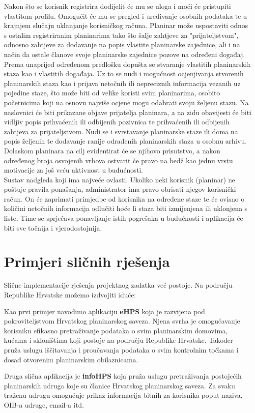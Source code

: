 		Nakon što se korisnik registrira dodijelit će mu se uloga  i moći će pristupiti vlastitom profilu. Omogućit će mu se pregled i uređivanje osobnih podataka te u krajnjem slučaju uklanjanje korisničkog računa. Planinar može uspostaviti odnos s ostalim registriranim planinarima tako što šalje zahtjeve za "prijateljstvom", odnosno zahtjeve za dodavanje na popis vlastite planinarske zajednice, ali i na način da ostale članove svoje planinarske zajednice pozove na određeni događaj. Prema unaprijed određenom predlošku dopušta se stvaranje vlastitih planinarskih staza kao i vlastitih događaja. Uz to se nudi i mogućnost ocjenjivanja stvorenih planinarskih staza kao i prijava netočnih ili nepreciznih informacija vezanih uz pojedine staze, što može biti od velike koristi svim planinarima, osobito početnicima koji na osnovu najviše ocjene mogu odabrati svoju željenu stazu. Na naslovnici će biti prikazane objave prijatelja planinara, a na zidu obavijesti će biti vidljiv popis prihvaćenih ili odbijenih pozivnica te prihvaćenih ili odbijenih zahtjeva za prijateljstvom. Nudi se i svrstavanje planinarske staze ili doma na popis željenih te dodavanje ranije odrađenih planinarskih staza u osobnu arhivu. Dolaskom planinara na cilj evidentirat će se njihovo prisutstvo, a nakon određenog broja osvojenih vrhova ostvarit će pravo na bedž kao jednu vrstu motivacije za još veću aktivnost u budućnosti. \\
		
		Sustav nadgleda  koji ima najveće ovlasti. Ukoliko neki korisnik (planinar) ne poštuje pravila ponašanja, administrator ima pravo obrisati njegov korisnički račun. On će zaprimati primjedbe od korisnika na određene staze te će ovisno o količini netočnih informacija odlučiti hoće li staza biti izmijenjena ili uklonjena s liste. Time se sprječava ponavljanje istih pogrešaka u budućnosti i aplikacija će biti sve točnija i vjerodostojnija. 
		
		
		\section{Primjeri sličnih rješenja}
		Slične implementacije rješenja projektnog zadatka već postoje. Na području Republike Hrvatske možemo izdvojiti iduće: 
		\begin{packed_enum}
			\item Kao prvi primjer navodimo aplikaciju \textbf{eHPS} koja je razvijena pod pokroviteljstvom Hrvatskog planinarskog saveza. Njena svrha je omogućavanje korisniku efikasno pretraživanje podataka o svim planinarskim domovima, kućama i skloništima koji postoje na području Republike Hrvatske. Također pruža uslugu iščitavanja i proučavanja podataka o svim kontrolnim točkama i dosad otvorenim planinarskim obilaznicama.
			\item Druga slična aplikacija je \textbf{infoHPS} koja pruža uslugu pretraživanja postojećih planinarskih udruga koje su članice Hrvatskog planinarskog saveza. Za svaku traženu udrugu omogućuje prikaz informacija bitnih za korisnika poput naziva, OIB-a udruge, email-a itd. 
		\end{packed_enum}
	
